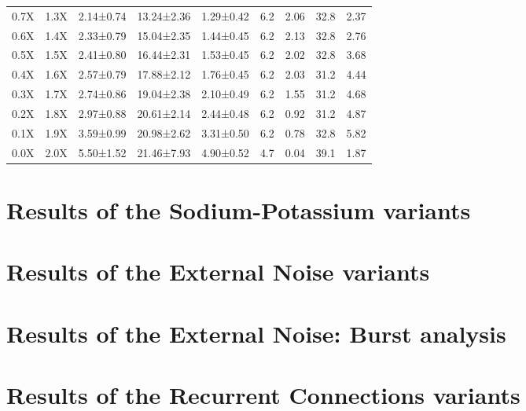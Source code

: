 \begin{table}[htbp]
\begin{adjustbox}{width=\textwidth}
\begin{tabular}{ccccccccc}
            0.7X       & 1.3X        & 2.14±0.74                     & 13.24±2.36 & 1.29±0.42 & 6.2 & 2.06 & 32.8 & 2.37 \\
            0.6X       & 1.4X        & 2.33±0.79                     & 15.04±2.35 & 1.44±0.45 & 6.2 & 2.13 & 32.8 & 2.76 \\
            0.5X       & 1.5X        & 2.41±0.80                     & 16.44±2.31 & 1.53±0.45 & 6.2 & 2.02 & 32.8 & 3.68 \\
            0.4X       & 1.6X        & 2.57±0.79                     & 17.88±2.12 & 1.76±0.45 & 6.2 & 2.03 & 31.2 & 4.44 \\
            0.3X       & 1.7X        & 2.74±0.86                     & 19.04±2.38 & 2.10±0.49 & 6.2 & 1.55 & 31.2 & 4.68 \\
            0.2X       & 1.8X        & 2.97±0.88                     & 20.61±2.14 & 2.44±0.48 & 6.2 & 0.92 & 31.2 & 4.87 \\
            0.1X       & 1.9X        & 3.59±0.99                     & 20.98±2.62 & 3.31±0.50 & 6.2 & 0.78 & 32.8 & 5.82 \\
            0.0X       & 2.0X        & 5.50±1.52                     & 21.46±7.93 & 4.90±0.52 & 4.7 & 0.04 & 39.1 & 1.87 \\
            \hline
        \end{tabular}
    \end{adjustbox}
\end{table}

\section{Results of the Sodium-Potassium variants}

\section{Results of the External Noise variants}

\section{Results of the External Noise: Burst analysis}

\section{Results of the Recurrent Connections variants}
